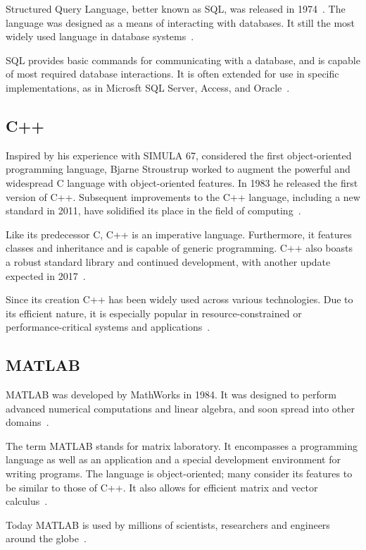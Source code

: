 \documentclass{article}
\begin{document}
Structured Query Language, better known as SQL, was released in 1974~\cite{sql1}. The language was designed as a means of interacting with databases. It still the most widely used language in database systems~\cite{sql2}.

SQL provides basic commands for communicating with a database, and is capable of most required database interactions. It is often extended for use in specific implementations, as in Microsft SQL Server, Access, and Oracle~\cite{sql2}.

\subsection{C++}

Inspired by his experience with SIMULA 67, considered the first object-oriented programming language, Bjarne Stroustrup worked to augment the powerful and widespread C language with object-oriented features. In 1983 he released the first version of C++. Subsequent improvements to the C++ language, including a new standard in 2011, have solidified its place in the field of computing~\cite{cplusplus1}.

Like its predecessor C, C++ is an imperative language. Furthermore, it features classes and inheritance and is capable of generic programming. C++ also boasts a robust standard library and continued development, with another update expected in 2017~\cite{cplusplus1}.

Since its creation C++ has been widely used across various technologies. Due to its efficient nature, it is especially popular in resource-constrained or performance-critical systems and applications~\cite{cplusplus2}.

\subsection{MATLAB}

MATLAB was developed by MathWorks in 1984. It was designed to perform advanced numerical computations and linear algebra, and soon spread into other domains~\cite{matlab1}.

The term MATLAB stands for matrix laboratory. It encompasses a programming language as well as an application and a special development environment for writing programs. The language is object-oriented; many consider its features to be similar to those of C++. It also allows for efficient matrix and vector calculus~\cite{matlab2}.

Today MATLAB is used by millions of scientists, researchers and engineers around the globe~\cite{matlab3}.
\end{document}
